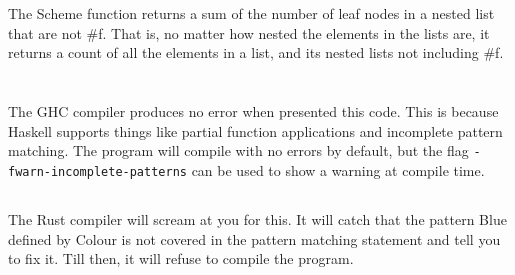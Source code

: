 \documentclass[letterpaper]{article}
\begin{document}
\section{}
The Scheme function returns a sum of the number of leaf nodes in a nested list
that are not \#f. That is, no matter how nested the elements in the lists are,
it returns a count of all the elements in a list, and its nested lists not 
including \#f.
%







\section{}
\subsection{}
The GHC compiler produces no error when presented this code. This is because
Haskell supports things like partial function applications and incomplete pattern matching.
The program will compile with no errors by default, but the flag
\texttt{-fwarn-incomplete-patterns}
can be used to show a warning at compile time.

\subsection{}
The Rust compiler will scream at you for this. It will catch that the pattern
Blue defined by Colour is not covered in the pattern matching statement and tell
you to fix it. Till then, it will refuse to compile the program.
\end{document}
